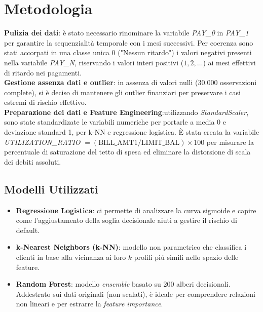 \documentclass{article}
\begin{document}
\section{Metodologia}

\textbf{Pulizia dei dati}: \`e stato necessario rinominare la variabile \textit{PAY\_0} in \textit{PAY\_1} per garantire la sequenzialit\`a temporale con i mesi successivi. Per coerenza sono stati accorpati in una classe unica $0$ ("Nessun ritardo") i valori negativi presenti nella variabile \textit{PAY\_N}, riservando i valori interi positivi ($1, 2, \dots$) ai mesi effettivi di ritardo nei pagamenti.\\
\textbf{Gestione assenza dati e outlier}: in assenza di valori nulli ($30.000$ osservazioni complete), si \`e deciso di mantenere gli outlier finanziari per preservare i casi estremi di rischio effettivo.\\
\textbf{Preparazione dei dati e Feature Engineering}:utilizzando \textit{StandardScaler}, sono state standardizate le variabili numeriche per portarle a media 0 e deviazione standard 1, per k-NN e regressione logistica. \`E stata creata la variabile \textit{UTILIZATION\_RATIO} $= (\text{BILL\_AMT1} / \text{LIMIT\_BAL}) \times 100$ per misurare la percentuale di saturazione del tetto di spesa ed eliminare la distorsione di scala dei debiti assoluti.
  

\subsection{Modelli Utilizzati}
\begin{itemize}
    \item \textbf{Regressione Logistica}: ci permette di analizzare la curva sigmoide e capire come l'aggiustamento della soglia decisionale aiuti a gestire il rischio di default.
    \item \textbf{k-Nearest Neighbors (k-NN)}: modello non parametrico che classifica i clienti in base alla vicinanza ai loro $k$ profili pi\'u simili nello spazio delle feature.
    \item \textbf{Random Forest}: modello \textit{ensemble} basato su 200 alberi decisionali. Addestrato sui dati originali (non scalati), \`e ideale per comprendere relazioni non lineari e per estrarre la \textit{feature importance}.
\end{itemize}
\end{document}

